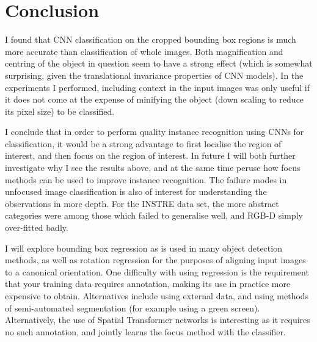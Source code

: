 \section{Conclusion}

I found that CNN classification on the cropped bounding box regions is much more accurate than classification of whole images. Both magnification and centring of the object in question seem to have a strong effect (which is somewhat surprising, given the translational invariance properties of CNN models). In the experiments I performed, including context in the input images was only useful if it does not come at the expense of minifying the object (down scaling to reduce its pixel size) to be classified.

I conclude that in order to perform quality instance recognition using \gls{CNN}s for classification, it would be a strong advantage to first localise the region of interest, and then focus on the region of interest.  In future I will both further investigate why I see the results above, and at the same time peruse how focus methods can be used to improve instance recognition. The failure modes in unfocused image classification is also of interest for understanding the observations in more depth. For the INSTRE data set, the more abstract categories were among those which failed to generalise well, and RGB-D simply over-fitted badly.

I will explore bounding box regression as is used in many object detection methods, as well as rotation regression for the purposes of aligning input images to a canonical orientation. One difficulty with using regression is the requirement that your training data requires annotation, making its use in practice more expensive to obtain. Alternatives include using external data, and using methods of semi-automated segmentation (for example using a green screen). Alternatively, the use of Spatial Transformer networks is interesting as it requires no such annotation, and jointly learns the focus method with the classifier.




